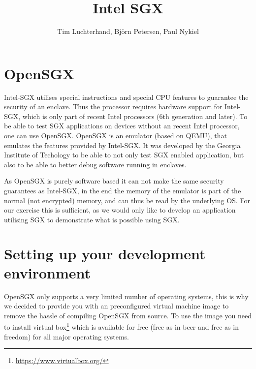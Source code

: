 \documentclass[DIN, pagenumber=false, fontsize=11pt, parskip=half]{scrartcl}
\title{Intel SGX}
\author{Tim Luchterhand, Björn Petersen, Paul Nykiel}
\begin{document}
    \maketitle
    \section{OpenSGX}
    Intel-SGX utilises special instructions and special CPU features to guarantee the security of an enclave.
    Thus the processor requires hardware support for Intel-SGX, which is only part of recent Intel
    processors (6th generation and later). To be able to test SGX applications on devices without an recent
    Intel processor, one can use OpenSGX. OpenSGX is an emulator (based on QEMU), that emulates the features
    provided by Intel-SGX. It was developed by the Georgia Institute of Techology to be able to not only
    test SGX enabled application, but also to be able to better debug software running in enclaves.

    As OpenSGX is purely software based it can not make the same security guarantees as Intel-SGX, in the end
    the memory of the emulator is part of the normal (not encrypted) memory, and can thus be read by the
    underlying OS.
    For our exercise this is sufficient, as we would only like to develop an application utilising SGX to demonstrate
    what is possible using SGX.

    \section{Setting up your development environment}
    OpenSGX only supports a very limited number of operating systems, this is why we decided to provide you with
    an preconfigured virtual machine image to remove the hassle of compiling OpenSGX from source. To use the image
    you need to install virtual box\footnote{\url{https://www.virtualbox.org/}}  which is available for free
    (free as in beer and free as in freedom) for all major operating systems. 
\end{document}
